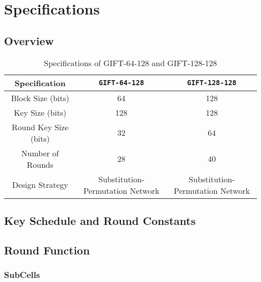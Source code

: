 \chapter{Specifications}

\section*{Overview}

\begin{table}[h]
	\centering
	\begin{tabular}{|c||c|c|}
		\hline
		\textbf{Specification} & \texttt{GIFT-64-128} & \texttt{GIFT-128-128} \\ \hline
		Block Size (bits)      & 64                   & 128                   \\ \hline
		Key Size (bits)        & 128                  & 128                   \\ \hline
		Round Key Size (bits)  & 32                   & 64                    \\ \hline
		Number of Rounds       & 28                   & 40                    \\ \hline
		Design Strategy        & Substitution-Permutation Network & Substitution-Permutation Network \\ \hline
	\end{tabular}
	\caption{Specifications of GIFT-64-128 and GIFT-128-128}
	\label{table:gift-specifications}
\end{table}

\newpage
\section{Key Schedule and Round Constants}

\newpage
\section{Round Function}

\subsection{SubCells}

\begin{table}[h]
	\caption{Specifications of $\gift$ Sbox $GS$}
	\label{table:gift-sbox}
\end{table}

